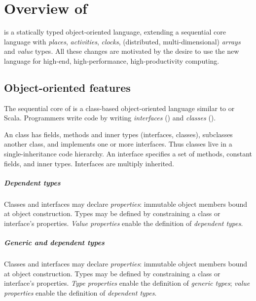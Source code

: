 \chapter{Overview of \Xten}

\Xten{} is a statically typed object-oriented language, extending a
sequential core language with 
\emph{places},
\emph{activities}, \emph{clocks},
(distributed, multi-dimensional) \emph{arrays} and \emph{value}
types. All these changes are motivated by the desire to use the new
language for high-end, high-performance, high-productivity computing.

\section{Object-oriented features}

The sequential core of \Xten{} is a class-based object-oriented language
similar to \java{} or Scala.
Programmers write \Xten{} code by writing
\emph{interfaces}
() and
\emph{classes}
().

An \Xten{} class has fields, methods and
inner types (interfaces, classes), subclasses another class, and
implements one or more interfaces. Thus \Xten{} classes live in a
single-inheritance code hierarchy.  An interface specifies a set
of methods, constant fields, and inner types.  Interfaces are
multiply inherited.

\iftypeparams

\paragraph{Dependent types}
Classes and interfaces may declare \emph{properties}: immutable object members bound at object construction.
Types may be defined by constraining a
class or interface's properties.
\emph{Value properties} enable the definition of \emph{dependent types}.

\else

\paragraph{Generic and dependent types}
Classes and interfaces may declare \emph{properties}: immutable object members bound at object construction.
Types may be defined by constraining a
class or interface's properties.
\emph{Type properties} enable the definition of \emph{generic types};
\emph{value properties} enable the definition of \emph{dependent types}.
\fi

